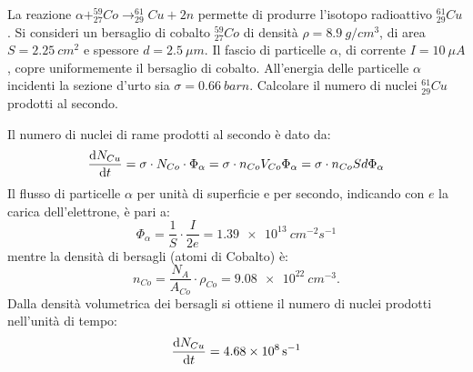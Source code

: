 \begin{Exercise}[title={Sezione d'urto}]
  La reazione $\alpha+^{59}_{27}Co \to ^{61}_{29}Cu + 2n$ permette di produrre l'isotopo radioattivo $^{61}_{29}Cu$. Si consideri un bersaglio di cobalto $^{59}_{27}Co$ di
  densit\`a $\rho = \SI{8.9}{g/cm^3}$, di area $S=\SI{2.25}{cm^2}$ e spessore $d=\SI{2.5}{\mu m}$. Il fascio di particelle $\alpha$, di corrente $I =\SI{10}{\mu A}$, copre uniformemente il bersaglio di cobalto. All’energia delle particelle $\alpha$ incidenti la sezione d’urto sia $\sigma = \SI{0.66}{barn}$.
  \Question Calcolare il numero di nuclei $^{61}_{29}Cu$ prodotti al secondo.
\end{Exercise}

\begin{Answer}
  Il numero di nuclei di rame prodotti al secondo è dato da:
  \[
  \dv{N_{Cu}}{t} = \sigma \cdot N_{Co} \cdot \Phi_\alpha = \sigma \cdot n_{Co} V_{Co} \Phi_\alpha = \sigma \cdot n_{Co} S d \Phi_\alpha
  \]
  Il flusso di particelle $\alpha$ per unit\`a di superficie e per secondo, indicando con $e$ la carica dell’elettrone, \`e pari a:
  \[
  \Phi_\alpha = \frac{1}{S}\cdot\frac{I}{2e} = \SI{1.39e+13}{cm^{-2}s^{-1}}
  \]
  mentre la densit\`a di bersagli (atomi di Cobalto) \`e:
  \[
  n_{Co} = \frac{N_A}{A_{Co}} \cdot \rho_{Co} = \SI{9.08e+22}{cm^{-3}}.
  \]
  Dalla densit\`a volumetrica dei bersagli si ottiene il numero di nuclei prodotti nell'unit\`a di tempo:
  \[
  \dv{N_{Cu}}{t} = \SI{4.68e+8}{s^{-1}}
  \]
\end{Answer}
  


